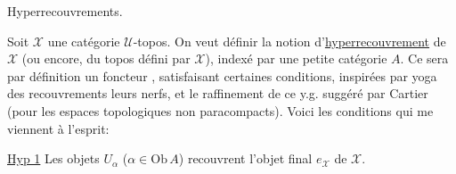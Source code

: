 
Hyperrecouvrements.

Soit $\mathcal X$ une catégorie $\mathcal U$-topos. On veut définir  la notion d'\uline{hyperrecouvrement} de $\mathcal X$ (ou encore, du topos défini par $\mathcal X$), indexé par une petite catégorie $A$.  Ce sera par définition un foncteur
, satisfaisant certaines conditions, inspirées par  yoga  des recouvrements  leurs nerfs, et le raffinement de ce y.g. suggéré par Cartier (pour les espaces topologiques non paracompacts). Voici les conditions qui me viennent à l'esprit:

\uline{Hyp 1} Les objets $U_\alpha$ ($\alpha\in\mathrm{Ob}\,A$) recouvrent l'objet final $e_{\mathcal X}$ de $\mathcal X$.

